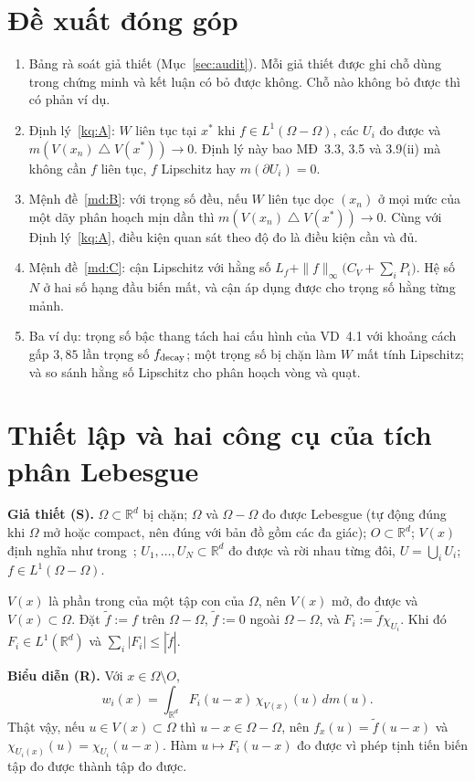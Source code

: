 \documentclass[12pt,a4paper]{article}
\theoremstyle{plain}
\theoremstyle{definition}
\newcommand{\R}{\mathbb{R}}
\newcommand{\sd}{\mathbin{\triangle}}
\newcommand{\dm}{\,dm}
\begin{document}
\section{Đề xuất đóng góp}

\begin{enumerate}[label=(\roman*)]
\item Bảng rà soát giả thiết (Mục~\ref{sec:audit}). Mỗi giả thiết được ghi chỗ dùng trong chứng minh và kết luận có bỏ được không. Chỗ nào không bỏ được thì có phản ví dụ.
\item Định lý~\ref{kq:A}: $W$ liên tục tại $x^*$ khi $f\in L^1(\Omega-\Omega)$, các $U_i$ đo được và $m(V(x_n)\sd V(x^*))\to 0$. Định lý này bao MĐ~3.3, 3.5 và 3.9(ii) mà không cần $f$ liên tục, $f$ Lipschitz hay $m(\partial U_i)=0$.
\item Mệnh đề~\ref{md:B}: với trọng số đều, nếu $W$ liên tục dọc $(x_n)$ ở mọi mức của một dãy phân hoạch mịn dần thì $m(V(x_n)\sd V(x^*))\to 0$. Cùng với Định lý~\ref{kq:A}, điều kiện quan sát theo độ đo là điều kiện cần và đủ.
\item Mệnh đề~\ref{md:C}: cận Lipschitz với hằng số $L_f+\|f\|_\infty\big(C_V+\sum_iP_i\big)$. Hệ số $N$ ở hai số hạng đầu biến mất, và cận áp dụng được cho trọng số hằng từng mảnh.
\item Ba ví dụ: trọng số bậc thang tách hai cấu hình của VD~4.1 với khoảng cách gấp $3{,}85$ lần trọng số $f_{\rm decay}$; một trọng số bị chặn làm $W$ mất tính Lipschitz; và so sánh hằng số Lipschitz cho phân hoạch vòng và quạt.
\end{enumerate}

\section{Thiết lập và hai công cụ của tích phân Lebesgue}

\textbf{Giả thiết (S).} $\Omega\subset\R^d$ bị chặn; $\Omega$ và $\Omega-\Omega$ đo được Lebesgue (tự động đúng khi $\Omega$ mở hoặc compact, nên đúng với bản đồ gồm các đa giác); $O\subset\R^d$; $V(x)$ định nghĩa như trong~\cite{huu2026}; $U_1,\dots,U_N\subset\R^d$ đo được và rời nhau từng đôi, $U=\bigcup_iU_i$; $f\in L^1(\Omega-\Omega)$.

$V(x)$ là phần trong của một tập con của $\Omega$, nên $V(x)$ mở, đo được và $V(x)\subset\Omega$. Đặt $\tilde f:=f$ trên $\Omega-\Omega$, $\tilde f:=0$ ngoài $\Omega-\Omega$, và $F_i:=\tilde f\chi_{U_i}$. Khi đó $F_i\in L^1(\R^d)$ và $\sum_i|F_i|\le|\tilde f|$.

\textbf{Biểu diễn (R).} Với $x\in\Omega\setminus O$,
\begin{equation}\label{eq:R}
w_i(x)=\int_{\R^d}F_i(u-x)\,\chi_{V(x)}(u)\dm(u).
\end{equation}
Thật vậy, nếu $u\in V(x)\subset\Omega$ thì $u-x\in\Omega-\Omega$, nên $f_x(u)=\tilde f(u-x)$ và $\chi_{U_i(x)}(u)=\chi_{U_i}(u-x)$. Hàm $u\mapsto F_i(u-x)$ đo được vì phép tịnh tiến biến tập đo được thành tập đo được.
\end{document}
